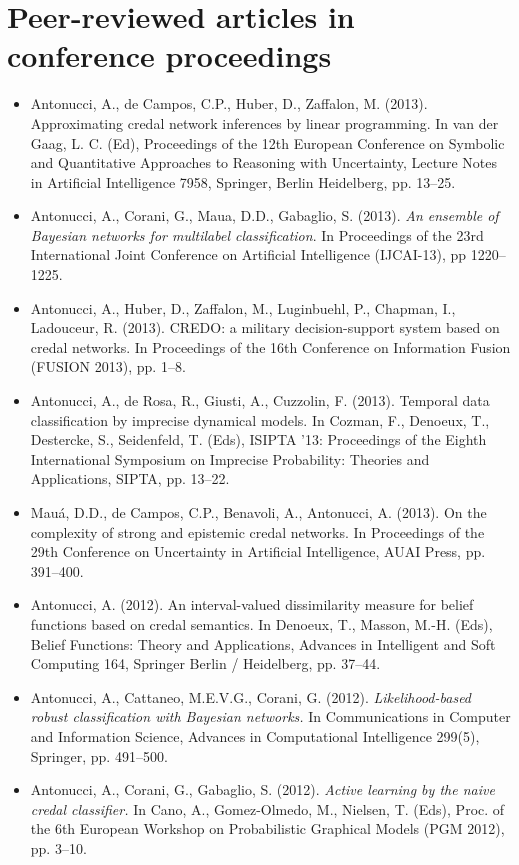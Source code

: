 \documentclass[11pt,a4paper]{moderncv}
\begin{document}
\section{Peer-reviewed articles in conference proceedings}
\begin{itemize}
\item Antonucci, A., de Campos, C.P., Huber, D., Zaffalon, M. (2013). Approximating credal network inferences by linear programming. In van der Gaag, L. C. (Ed), Proceedings of the 12th European Conference on Symbolic and Quantitative Approaches to Reasoning with Uncertainty, Lecture Notes in Artificial Intelligence 7958, Springer, Berlin Heidelberg, pp. 13--25.
\item Antonucci, A., Corani, G., Maua, D.D., Gabaglio, S. (2013). \textit{An ensemble of Bayesian networks for multilabel classification}. In Proceedings of the 23rd International Joint Conference on Artificial Intelligence (IJCAI-13), pp 1220--1225.
\item Antonucci, A., Huber, D., Zaffalon, M., Luginbuehl, P., Chapman, I., Ladouceur, R. (2013). CREDO: a military decision-support system based on credal networks. In Proceedings of the 16th Conference on Information Fusion (FUSION 2013), pp. 1--8.
\item Antonucci, A., de Rosa, R., Giusti, A., Cuzzolin, F. (2013). Temporal data classification by imprecise dynamical models. In Cozman, F., Denoeux, T., Destercke, S., Seidenfeld, T. (Eds), ISIPTA '13: Proceedings of the Eighth International Symposium on Imprecise Probability: Theories and Applications, SIPTA, pp. 13--22.
\item Mau\'a, D.D., de Campos, C.P., Benavoli, A., Antonucci, A. (2013). On the complexity of strong and epistemic credal networks. In Proceedings of the 29th Conference on Uncertainty in Artificial Intelligence, AUAI Press, pp. 391--400.
\item Antonucci, A. (2012). An interval-valued dissimilarity measure for belief functions based on credal semantics. In Denoeux, T., Masson, M.-H. (Eds), Belief Functions: Theory and Applications, Advances in Intelligent and Soft Computing 164, Springer Berlin / Heidelberg, pp. 37--44.
\item Antonucci, A., Cattaneo, M.E.V.G., Corani, G. (2012). \textit{Likelihood-based robust classification with Bayesian networks.} In Communications in Computer and Information Science, Advances in Computational Intelligence 299(5), Springer, pp. 491--500.
\item Antonucci, A., Corani, G., Gabaglio, S. (2012). \textit{Active learning by the naive credal classifier.} In Cano, A., Gomez-Olmedo, M., Nielsen, T. (Eds), Proc. of the 6th European Workshop on Probabilistic Graphical Models (PGM 2012), pp. 3--10.

\end{itemize}
\end{document}
